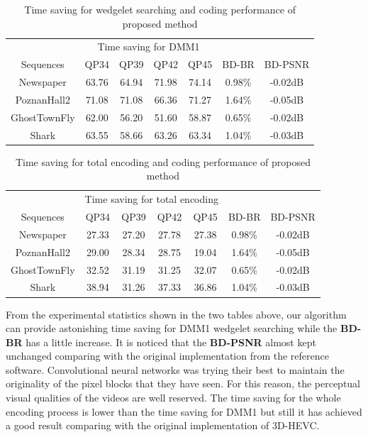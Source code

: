 \begin{table}[!htbp]
    \caption{Time saving for wedgelet searching and coding performance of proposed method}
    \bigskip\label{tab:ts-dmm}
    \centering
    \begin{tabular}{c c c c c c c}
        \toprule
         & \multicolumn{4}{c}{Time saving for DMM1} & & \\\cline{2-5}
        Sequences & QP34 & QP39 & QP42 & QP45 & BD-BR & BD-PSNR \\
        \midrule
        Newspaper       & 63.76 & 64.94 & 71.98 & 74.14 & 0.98\% & -0.02dB \\
        PoznanHall2    & 71.08 & 71.08 & 66.36 & 71.27 & 1.64\% & -0.05dB \\
        GhostTownFly       & 62.00 & 56.20 & 51.60 & 58.87 & 0.65\% & -0.02dB \\
        Shark           & 63.55 & 58.66 & 63.26 & 63.34 & 1.04\% & -0.03dB \\
    \end{tabular}
\end{table}

\begin{table}[!htbp]
    \caption{Time saving for total encoding and coding performance of proposed method}
    \bigskip\label{tab:ts-total}
    \centering
    \begin{tabular}{c c c c c c c}
        \toprule
         & \multicolumn{4}{c}{Time saving for total encoding} & & \\\cline{2-5}
        Sequences & QP34 & QP39 & QP42 & QP45 & BD-BR & BD-PSNR \\
        \midrule
        Newspaper       & 27.33 & 27.20 & 27.78 & 27.38 & 0.98\% & -0.02dB \\
        PoznanHall2     & 29.00 & 28.34 & 28.75 & 19.04 & 1.64\% & -0.05dB \\
        GhostTownFly    & 32.52 & 31.19 & 31.25 & 32.07 & 0.65\% & -0.02dB \\
        Shark           & 38.94 & 31.26 & 37.33 & 36.86 & 1.04\% & -0.03dB \\
    \end{tabular}
\end{table}

From the experimental statistics shown in the two tables above,
our algorithm can provide astonishing time saving for DMM1
wedgelet searching while the \textbf{BD-BR} has a little increase.
It is noticed that the \textbf{BD-PSNR} almost kept unchanged comparing 
with the original implementation from the reference software.
Convolutional neural networks
was trying their best to maintain the originality of the
pixel blocks that they have seen.
For this reason, the perceptual visual qualities of the videos
are well reserved.
The time saving for the whole encoding process is lower than 
the time saving for DMM1 but still it has achieved a good result 
comparing with the original implementation of 3D-HEVC\@.
